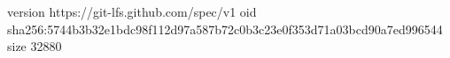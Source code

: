 version https://git-lfs.github.com/spec/v1
oid sha256:5744b3b32e1bdc98f112d97a587b72c0b3c23e0f353d71a03bcd90a7ed996544
size 32880
